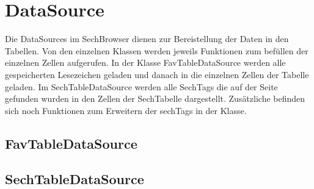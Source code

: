 
\section{DataSource}
Die DataSources im SechBrowser dienen zur Bereistellung der Daten in den Tabellen. Von den einzelnen Klassen werden jeweils Funktionen zum befüllen der einzelnen Zellen aufgerufen. In der Klasse FavTableDataSource werden alle gespeicherten Lesezeichen geladen und danach in die einzelnen Zellen der Tabelle geladen. Im SechTableDataSource werden alle SechTags die auf der Seite gefunden wurden in den Zellen der SechTabelle dargestellt. Zusätzliche befinden sich noch Funktionen zum Erweitern der sechTags in der Klasse.

\subsection{FavTableDataSource}
\subsection{SechTableDataSource}


